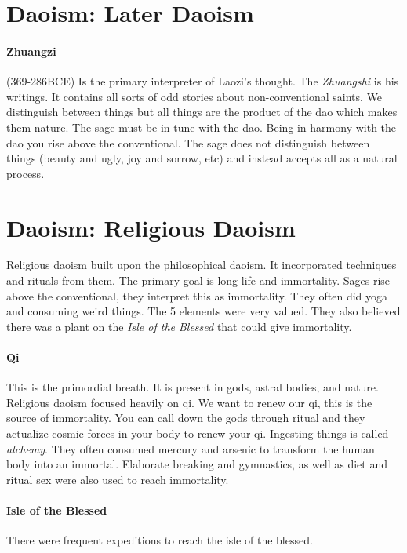 \documentclass{article}
\begin{document}
\section*{Daoism: Later Daoism}
\label{sec:daoism_later_daoism}
\paragraph{Zhuangzi}
\label{par:zhuangzi}
(369-286BCE) Is the primary interpreter of Laozi's thought. The \emph{Zhuangshi} is his writings. It contains all sorts of odd stories about non-conventional saints. We distinguish between things but all things are the product of the dao which makes them nature. The sage must be in tune with the dao. Being in harmony with the dao you rise above the conventional. The sage does not distinguish between things (beauty and ugly, joy and sorrow, etc) and instead accepts all as a natural process.

\section*{Daoism: Religious Daoism}
\label{sec:daoism_religious_daoism}
Religious daoism built upon the philosophical daoism. It incorporated techniques and rituals from them. The primary goal is long life and immortality. Sages rise above the conventional, they interpret this as immortality. They often did yoga and consuming weird things. The 5 elements were very valued. They also believed there was a plant on the \emph{Isle of the Blessed} that could give immortality.

\paragraph{Qi}
\label{par:qi}
This is the primordial breath. It is present in gods, astral bodies, and nature. Religious daoism focused heavily on qi. We want to renew our qi, this is the source of immortality. You can call down the gods through ritual and they actualize cosmic forces in your body to renew your qi. Ingesting things is called \emph{alchemy}. They often consumed mercury and arsenic to transform the human body into an immortal. Elaborate breaking and gymnastics, as well as diet and ritual sex were also used to reach immortality.

\paragraph{Isle of the Blessed}
\label{par:isle_of_the_blessed}
There were frequent expeditions to reach the isle of the blessed.
\end{document}
